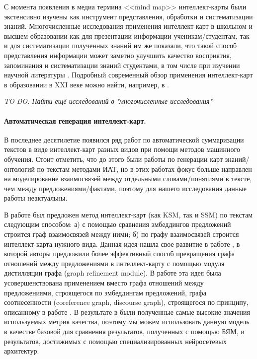 \documentclass[12pt]{article}
\begin{document}
С момента появления в медиа термина <<mind map>> интеллект-карты были экстенсивно изучены как инструмент представления, обработки и систематизации знаний. Многочисленные исследования применения интеллект-карт в школьном и высшем образовании как для презентации информации ученикам/студентам, так и для систематизации полученных знаний им же показали, что такой способ представления информации может заметно улучшить качество восприятия, запоминания и систематизации знаний студентами, в том числе при изучении научной литературы \cite{guerrero2015mind}. Подробный современный обзор применения интеллект-карт в образовании в XXI веке можно найти, например, в \cite{mitra2023tradition}.

\textit{TO-DO: Найти ещё исследований в "многочисленные исследования"}

\paragraph{Автоматическая генерация интеллект-карт.} В последнее десятилетие появился ряд работ по автоматической суммаризации текстов в виде интеллект-карт разных видов при помощи методов машинного обучения. Стоит отметить, что до этого были работы по генерации карт знаний/онтологий по текстам методами ИАТ, но в этих работах фокус больше направлен на моделирование взаимосвязей между отдельными словами/понятиями в тексте, чем между предложениями/фактами, поэтому для нашего исследования данные работы неактуальны.

В работе \cite{wei2019revealing} был предложен метод интеллект-карт (как KSM, так и SSM) по текстам следующим способом: а) с помощью сравнения эмбеддингов предложений строится граф взаимосвязей между ними; б) по графу взаимосвязей строится интеллект-карта нужного вида. Данная идея нашла свое развитие в работе \cite{hu2021efficient}, в которой авторы предложили более эффективный способ превращения графа отношений между предложениями в интеллект-карту с помощью модуля дистилляции графа (graph refinement module). В работе \cite{zhang2024coreference} эта идея была усовершенствована применением вместо графа отношений между предложениями, строящегося по эмбеддингам предложений, графа соотнесенности (coreference graph, discourse graph), строящегося по принципу, описанному в работе \cite{xu2019discourse}. В результате в \cite{zhang2024coreference} были полученные самые высокие значения используемых метрик качества, поэтому мы можем использовать данную модель в качестве базовой для сравнения результатов, полученных с помощью БЯМ, и результатов, достижимых с помощью специализированных нейросетевых архитектур.
\end{document}
